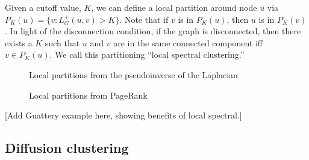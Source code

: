 \documentclass[12pt]{article}
\theoremstyle{plain}
\begin{document}
Given a cutoff value, $K$, we can define a local partition around node
$u$ via $P_K(u) = \{ v : L_G^{+}(u,v) > K \}$.  Note that if $v$ is in
$P_K(u)$, then $u$ is in $P_K(v)$.  In light of the disconnection
condition, if the graph is disconnected, then there exists a $K$ such
that $u$ and $v$ are in the same connected component iff
$v \in P_K(u)$.  We call this partitioning ``local spectral
clustering.''

\begin{figure}
    \centering
    \caption{Local partitions from the pseudoinverse of the Laplacian}
\end{figure}
\begin{figure}
    \centering
    \caption{Local partitions from PageRank}
\end{figure}

[Add Guattery example here, showing benefits of local spectral.]


\subsection{Diffusion clustering}
\end{document}
